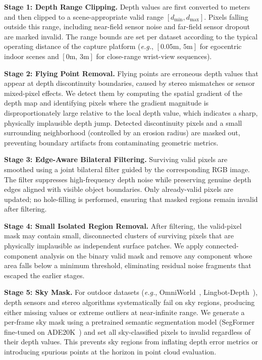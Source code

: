 \documentclass{llmxive}
\begin{document}
\textbf{Stage 1: Depth Range Clipping.}
Depth values are first converted to meters and then clipped to a scene-appropriate valid range $[d_{\min}, d_{\max}]$. 
%
Pixels falling outside this range, including near-field sensor noise and far-field sensor dropout are marked invalid.
%
The range bounds are set per dataset according to the typical operating distance of the capture platform (\emph{e.g.}, $[0.05\text{m},\,5\text{m}]$ for egocentric indoor scenes and $[0\text{m},\,3\text{m}]$ for close-range wrist-view sequences).

\textbf{Stage 2: Flying Point Removal.}
Flying points are erroneous depth values that appear at depth discontinuity boundaries, caused by stereo mismatches or sensor mixed-pixel effects.
%
We detect them by computing the spatial gradient of the depth map and identifying pixels where the gradient magnitude is disproportionately large relative to the local depth value, which indicates a sharp, physically implausible depth jump.
%
Detected discontinuity pixels and a small surrounding neighborhood (controlled by an erosion radius) are masked out, preventing boundary artifacts from contaminating geometric metrics.

\textbf{Stage 3: Edge-Aware Bilateral Filtering.}
Surviving valid pixels are smoothed using a joint bilateral filter guided by the corresponding RGB image.
%
The filter suppresses high-frequency depth noise while preserving genuine depth edges aligned with visible object boundaries.
%
Only already-valid pixels are updated; no hole-filling is performed, ensuring that masked regions remain invalid after filtering.

\textbf{Stage 4: Small Isolated Region Removal.}
After filtering, the valid-pixel mask may contain small, disconnected clusters of surviving pixels that are physically implausible as independent surface patches.
%
We apply connected-component analysis on the binary valid mask and remove any component whose area falls below a minimum threshold, eliminating residual noise fragments that escaped the earlier stages.

\textbf{Stage 5: Sky Mask.}
For outdoor datasets (\emph{e.g.}, OmniWorld~\citep{zhou2025omniworld}, Lingbot-Depth~\citep{lingbot-depth2026}), depth sensors and stereo algorithms systematically fail on sky regions, producing either missing values or extreme outliers at near-infinite range. 
%
We generate a per-frame sky mask using a pretrained semantic segmentation model (SegFormer~\citep{xie2021segformer} fine-tuned on ADE20K~\citep{zhou2019ade20k}) and set all sky-classified pixels to invalid regardless of their depth values.
%
This prevents sky regions from inflating depth error metrics or introducing spurious points at the horizon in point cloud evaluation.
\end{document}
